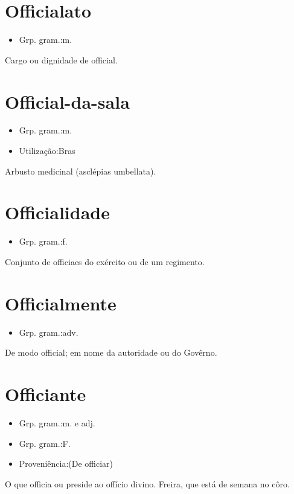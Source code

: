 \section{Officialato}
\begin{itemize}
\item {Grp. gram.:m.}
\end{itemize}
Cargo ou dignidade de official.
\section{Official-da-sala}
\begin{itemize}
\item {Grp. gram.:m.}
\end{itemize}
\begin{itemize}
\item {Utilização:Bras}
\end{itemize}
Arbusto medicinal (\textunderscore asclépias umbellata\textunderscore ).
\section{Officialidade}
\begin{itemize}
\item {Grp. gram.:f.}
\end{itemize}
Conjunto de officiaes do exército ou de um regimento.
\section{Officialmente}
\begin{itemize}
\item {Grp. gram.:adv.}
\end{itemize}
De modo official; em nome da autoridade ou do Govêrno.
\section{Officiante}
\begin{itemize}
\item {Grp. gram.:m.  e  adj.}
\end{itemize}
\begin{itemize}
\item {Grp. gram.:F.}
\end{itemize}
\begin{itemize}
\item {Proveniência:(De \textunderscore officiar\textunderscore )}
\end{itemize}
O que officia ou preside ao offício divino.
Freira, que está de semana no côro.
